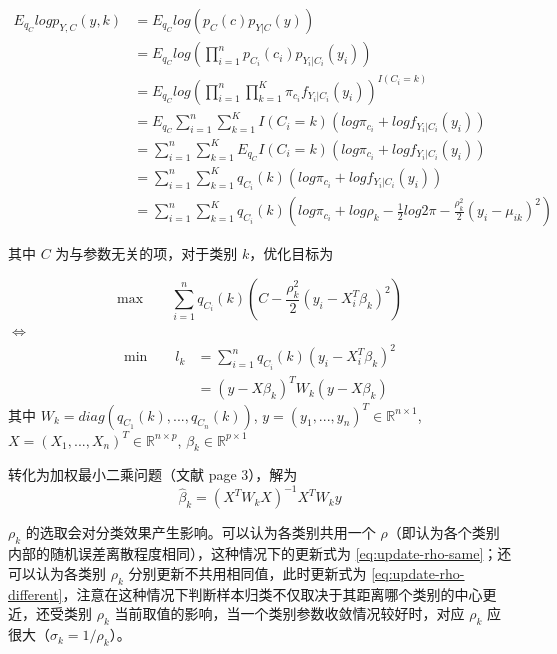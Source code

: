 \documentclass[12pt, a4paper, oneside]{article}
\numberwithin{equation}{section}
\begin{document}
\begin{equation}
	\begin{aligned}
		E_{q_C}log p_{Y,C}(y,k) &= E_{q_C} log \left(p_C(c) p_{Y|C}(y)\right)\\
		&= E_{q_C} log \left(\prod^{n}_{i=1} p_{C_i}(c_i) p_{Y_i|C_i}(y_i) \right) \\
		&= E_{q_C} log \left(\prod^{n}_{i=1}\prod^{K}_{k=1} \pi_{c_i} f_{Y_i|C_i}(y_i) \right)^{I(C_i=k)} \\
		&= E_{q_C} \sum^{n}_{i=1}\sum^{K}_{k=1} I(C_i=k)\left( log\pi_{c_i} + log f_{Y_i|C_i}(y_i) \right) \\
		&= \sum^{n}_{i=1}\sum^{K}_{k=1} E_{q_C} I(C_i=k)\left( log\pi_{c_i} + log f_{Y_i|C_i}(y_i) \right) \\
		&= \sum^{n}_{i=1}\sum^{K}_{k=1} q_{C_i}(k)\left( log\pi_{c_i} + log f_{Y_i|C_i}(y_i) \right) \\
		&= \sum^{n}_{i=1}\sum^{K}_{k=1} q_{C_i}(k)\left( log\pi_{c_i} + log \rho_k - \frac{1}{2} log 2\pi - \frac{\rho_k^2}{2}(y_i - \mu_{ik})^2 \right) 
	\end{aligned}
\label{eq:l}
\end{equation}

其中 $C$ 为与参数无关的项，对于类别 $k$，优化目标为

\begin{equation}
	\text{max}\qquad \displaystyle\sum_{i=1}^{n}q_{C_i}(k)\left(C-\frac{\rho_k^2}{2}(y_i - X_i^T \beta_k)^2 \right)
\end{equation}
$\iff$
\begin{equation}
	\begin{aligned}
		\text{min}\qquad l_k &=  \displaystyle\sum_{i=1}^{n}q_{C_i}(k)\left(y_i - X_i^T \beta_k\right)^2 \\
		&= (y - X\beta_k)^T W_k (y - X\beta_k)
	\end{aligned}
\end{equation}
其中 $W_k = diag(q_{C_1}(k),...,q_{C_n}(k))$, $y = (y_1,...,y_n)^T\in \mathbb{R}^{n\times 1}$, $X = (X_1, ..., X_n)^T\in \mathbb{R}^{n\times p}$, $\beta_k \in \mathbb{R}^{p\times 1}$

转化为加权最小二乘问题（文献 \cite{wls} page 3），解为
\begin{equation}
	\hat \beta_k = (X^T W_k X)^{-1}X^T W_k y
\end{equation}

$\rho_k$ 的选取会对分类效果产生影响。可以认为各类别共用一个 $\rho$（即认为各个类别内部的随机误差离散程度相同），这种情况下的更新式为 \ref{eq:update-rho-same}；还可以认为各类别 $\rho_k$ 分别更新不共用相同值，此时更新式为 \ref{eq:update-rho-different}，注意在这种情况下判断样本归类不仅取决于其距离哪个类别的中心更近，还受类别 $\rho_k$ 当前取值的影响，当一个类别参数收敛情况较好时，对应 $\rho_k$ 应很大（$\sigma_k = 1/\rho_k$）。
\end{document}
